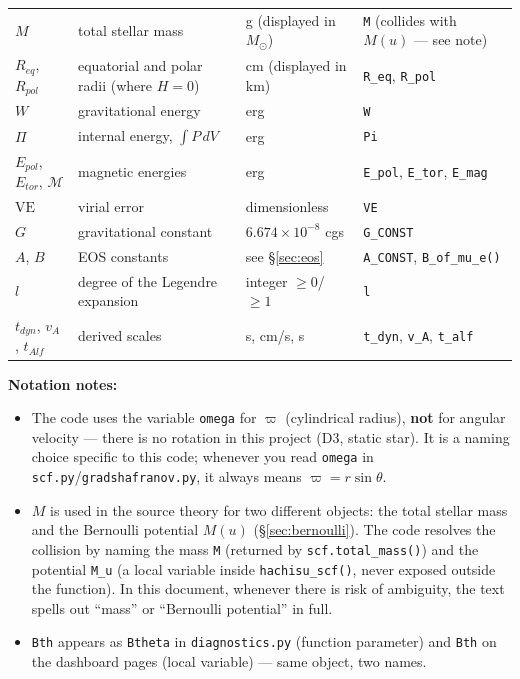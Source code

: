 \documentclass[11pt,a4paper]{scrartcl}
\newcommand{\musun}{\ensuremath{M_\odot}}
\newcommand{\code}[1]{\texttt{\small #1}}
\begin{document}
\begin{longtable}{@{}p{2.1cm}p{4.6cm}p{2.6cm}p{4.4cm}@{}}
$M$ & total stellar mass & g (displayed in \musun) & \code{M} (collides with $M(u)$ --- see note)\\
$R_{eq}$, $R_{pol}$ & equatorial and polar radii (where $H=0$) & cm (displayed in km) & \code{R\_eq}, \code{R\_pol}\\
$W$ & gravitational energy & erg & \code{W}\\
$\Pi$ & internal energy, $\int P\,dV$ & erg & \code{Pi}\\
$E_{pol}$, $E_{tor}$, $\mathcal{M}$ & magnetic energies & erg & \code{E\_pol}, \code{E\_tor}, \code{E\_mag}\\
$\mathrm{VE}$ & virial error & dimensionless & \code{VE}\\
$G$ & gravitational constant & $6.674\times10^{-8}$ cgs & \code{G\_CONST}\\
$A$, $B$ & EOS constants & see \S\ref{sec:eos} & \code{A\_CONST}, \code{B\_of\_mu\_e()}\\
$l$ & degree of the Legendre expansion & integer $\ge0$/$\ge1$ & \code{l}\\
$t_{dyn}$, $v_A$, $t_{Alf}$ & derived scales & s, cm/s, s & \code{t\_dyn}, \code{v\_A}, \code{t\_alf}\\
\bottomrule
\end{longtable}
\endgroup

\textbf{Notation notes:}
\begin{itemize}[leftmargin=1.4em,itemsep=0.3em]
\item The code uses the variable \code{omega} for $\varpi$ (cylindrical
  radius), \textbf{not} for angular velocity --- there is no rotation in
  this project (D3, static star). It is a naming choice specific to this
  code; whenever you read \code{omega} in \code{scf.py}/\code{gradshafranov.py},
  it always means $\varpi=r\sin\theta$.
\item $M$ is used in the source theory for two different objects: the
  total stellar mass and the Bernoulli potential $M(u)$
  (\S\ref{sec:bernoulli}). The code resolves the collision by naming the
  mass \code{M} (returned by \code{scf.total\_mass()}) and the potential
  \code{M\_u} (a local variable inside \code{hachisu\_scf()}, never
  exposed outside the function). In this document, whenever there is risk
  of ambiguity, the text spells out ``mass'' or ``Bernoulli potential''
  in full.
\item \code{Bth} appears as \code{Btheta} in \code{diagnostics.py}
  (function parameter) and \code{Bth} on the dashboard pages (local
  variable) --- same object, two names.
\end{itemize}
\end{document}
